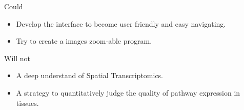 \documentclass[a4paper]{article}
\begin{document}
Could 
 
\begin{itemize}
  \item Develop the interface to become user friendly and easy navigating. 
  \item Try to create a images zoom-able program.
\end{itemize}

Will not
 
\begin{itemize}
  \item A deep understand of Spatial Transcriptomics.
  \item A strategy to quantitatively judge the quality of pathway expression in tissues.
\end{itemize}


\clearpage
{}

\end{document}
